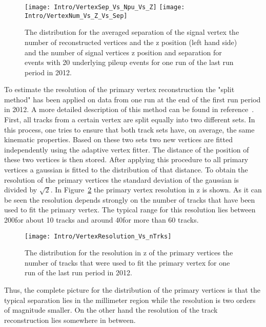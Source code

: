\begin{figure}[!Hhtb]
    \centering
    \texttt{[image: Intro/VertexSep\_Vs\_Npu\_Vs\_Z]}
    \texttt{[image: Intro/VertexNum\_Vs\_Z\_Vs\_Sep]}
    \caption[Vertex separation \vs number of reconstructed vertices and \vs z position of the vertex. Number of signal vertices \vs z position and separation for events with 20 underlying pileup events]{The distribution for the averaged separation of the signal vertex \vs the number of reconstructed vertices and the z position (left hand side) and the number of signal vertices \vs z position and separation for events with 20 underlying pileup events for one run of the last run period in 2012. \label{plot:IntroVertexSep2D}}
\end{figure}

To estimate the resolution of the primary vertex reconstruction the "split method" has been applied on data from one run at the end of the first run period in 2012. A more detailed description of this method can be found in reference~. First, all tracks from a certain vertex are split equally into two different sets. In this process, one tries to ensure that both track sets have, on average, the same kinematic properties. Based on these two sets two new vertices are fitted independently using the adaptive vertex fitter. The distance of the position of these two vertices is then stored. After applying this procedure to all primary vertices a gaussian is fitted to the distribution of that distance. To obtain the resolution of the primary vertices the standard deviation of the gaussian is divided by $\sqrt{2}$. In Figure~\ref{plot:IntroVertexRes} the primary vertex resolution in z is shown. As it can be seen the resolution depends strongly on the number of tracks that have been used to fit the primary vertex. The typical range for this resolution lies between 200\mum for about 10 tracks and around 40\mum for more than 60 tracks.

\begin{figure}[!Hhtb]
    \centering
    \texttt{[image: Intro/VertexResolution\_Vs\_nTrks]}
    \caption[Vertex resolution \vs number of used tracks]{The distribution for the resolution in z of the primary vertices \vs the number of tracks that were used to fit the primary vertex for one run of the last run period in 2012. \label{plot:IntroVertexRes}}
\end{figure}

Thus, the complete picture for the distribution of the primary vertices is that the typical separation lies in the millimeter region while the resolution is two orders of magnitude smaller. On the other hand the resolution of the track reconstruction lies somewhere in between.\\

